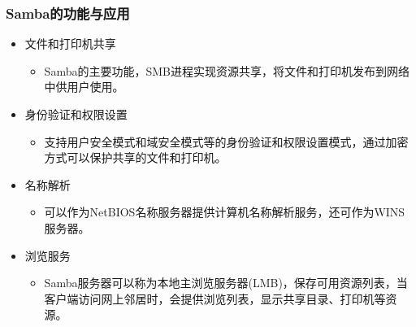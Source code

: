 \documentclass[xcolor=svgnames,presentation]{beamer}
\begin{document}
\begin{frame}
\frametitle{Samba的功能与应用}
\label{sec-2-4}
\begin{itemize}

\item 文件和打印机共享
\label{sec-2-4-1}%
\begin{itemize}

\item Samba的主要功能，SMB进程实现资源共享，将文件和打印机发布到网络中供用户使用。
\label{sec-2-4-1-1}%
\end{itemize} %

\item 身份验证和权限设置
\label{sec-2-4-2}%
\begin{itemize}

\item 支持用户安全模式和域安全模式等的身份验证和权限设置模式，通过加密方式可以保护共享的文件和打印机。
\label{sec-2-4-2-1}%
\end{itemize} %

\item 名称解析
\label{sec-2-4-3}%
\begin{itemize}

\item 可以作为NetBIOS名称服务器提供计算机名称解析服务，还可作为WINS服务器。
\label{sec-2-4-3-1}%
\end{itemize} %

\item 浏览服务
\label{sec-2-4-4}%
\begin{itemize}

\item Samba服务器可以称为本地主浏览服务器(LMB)，保存可用资源列表，当客户端访问网上邻居时，会提供浏览列表，显示共享目录、打印机等资源。
\label{sec-2-4-4-1}%
\end{itemize} %
\end{itemize} %
\end{frame}
\end{document}
